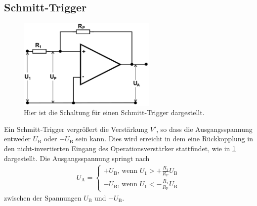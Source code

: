\subsection{Schmitt-Trigger}
\begin{figure}[h!]
	\centering
	\includegraphics[width = 0.6\textwidth]{../Grafiken/Schmitt-Trigger.png}
	\caption{Hier ist die Schaltung für einen Schmitt-Trigger dargestellt. \cite{V51}\label{fig:Schmitt-Trigger}}
\end{figure}
Ein Schmitt-Trigger vergrößert die Verstärkung $V'$, so dass die Ausgangsspannung entweder $U_\text{B}$ oder $-U_\text{B}$ sein kann.
Dies wird erreicht in dem eine Rückkopplung in den nicht-invertierten Eingang des Operationsverstärker stattfindet, wie in \cref{fig:Schmitt-Trigger} dargestellt.
Die Ausgangsspannung springt nach
\begin{align}
	U_\text{A}=
	\begin{cases}
		+U_\text{B}\text{, wenn } U_1 > +\frac{R_1}{R_\text{P}}U_\text{B} \\
		-U_\text{B}\text{, wenn } U_1 < -\frac{R_1}{R_\text{P}}U_\text{B}
	\end{cases}
\end{align}
zwischen der Spannungen $U_\text{B}$ und $-U_\text{B}$.
\newpage
